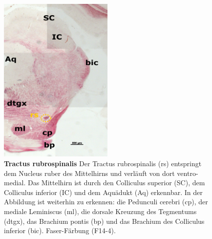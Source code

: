 \documentclass[12pt,a4paper,pdftex]{article}
\begin{document}
\begin{figure}[H]
    \centering
    \includegraphics[width=0.5\textwidth]{pictures/Bilder_Laura/rubrospinal_tract_F14_4P_025x.png}
    \caption[Tractus rubrospinalis]{\textbf{Tractus rubrospinalis} Der Tractus rubrospinalis (rs) entspringt dem Nucleus ruber des Mittelhirns und verläuft von dort ventro-medial. Das Mittelhirn ist durch den Colliculus superior (SC), dem Colliculus inferior (IC) und dem Aquädukt (Aq) erkennbar. In der Abbildung ist weiterhin zu erkennen: die Pedunculi cerebri (cp), der mediale Leminiscus (ml), die dorsale Kreuzung des Tegmentums (dtgx), das Brachium pontis (bp) und das Brachium des Colliculus inferior (bic). Faser-Färbung (F14-4).}
    \label{fig:rubrospinal_tract}
\end{figure}
\end{document}
